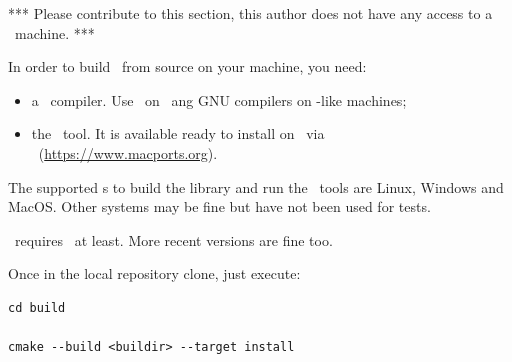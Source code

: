 *** Please contribute to this section, this author does not have any access to a \Windows\ machine. ***

In order to build \mf\ from source on your machine, you need:
\begin{itemize}
\item a \CPlusplus\ compiler. Use \xcode\ on \MacOS\ ang GNU compilers on \Unix -like machines;
\item the \cmake\ tool. It is available ready to install on \MacOS\ via \macports\ (\url{https://www.macports.org}).
\end{itemize}

The supported \OS s to build the library and run the \CLI\ tools are Linux, Windows and MacOS. Other systems may be fine but have not been used for tests.

\mf\ requires \CPlusplus\ at least. More recent versions are fine too.

Once in the local repository clone, just execute:
\begin{lstlisting}[language=Terminal]
cd build

cmake --build <buildir> --target install
\end{lstlisting}

